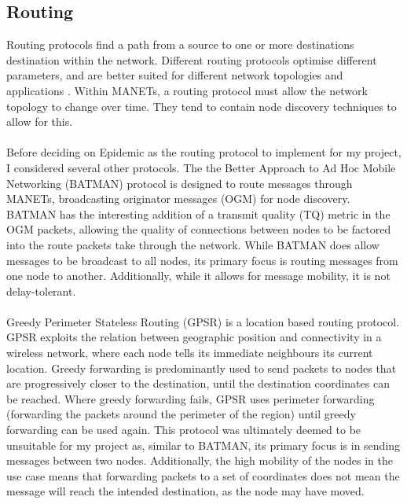 \documentclass[12pt,a4paper]{report}
\begin{document}
\subsection{Routing}
Routing protocols find a path from a source to one or more destinations destination within the network. Different routing protocols optimise different parameters, and are better suited for different network topologies and applications \cite{princom}. Within MANETs, a routing protocol must allow the network topology to change over time. They tend to contain node discovery techniques to allow for this. \\ \\
Before deciding on Epidemic as the routing protocol to implement for my project, I considered several other protocols. The the Better Approach to Ad Hoc Mobile Networking (BATMAN) protocol \cite{batman} is designed to route messages through MANETs, broadcasting originator messages (OGM) for node discovery. BATMAN has the interesting addition of a transmit quality (TQ) metric in the OGM packets, allowing the quality of connections between nodes to be factored into the route packets take through the network. While BATMAN does allow messages to be broadcast to all nodes, its primary focus is routing messages from one node to another. Additionally, while it allows for message mobility, it is not delay-tolerant.\\ \\
Greedy Perimeter Stateless Routing (GPSR) \cite{gpsr} is a location based routing protocol. GPSR exploits the relation between geographic position and connectivity in a wireless network, where each node tells its immediate neighbours its current location. Greedy forwarding is predominantly used to send packets to nodes that are progressively closer to the destination, until the destination coordinates can be reached. Where greedy forwarding fails, GPSR uses perimeter forwarding (forwarding the packets around the perimeter of the region) until greedy forwarding can be used again. This protocol was ultimately deemed to be unsuitable for my project as, similar to BATMAN, its primary focus is in sending messages between two nodes. Additionally, the high mobility of the nodes in the use case means that forwarding packets to a set of coordinates does not mean the message will reach the intended destination, as the node may have moved.
\end{document}
